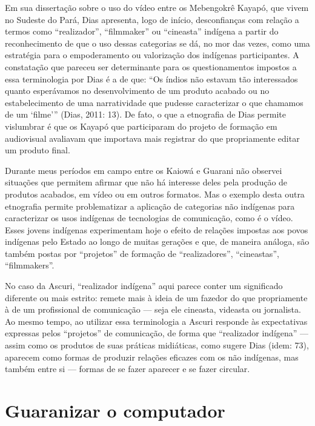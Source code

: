 Em sua dissertação sobre o uso do vídeo entre os Mebengokrê Kayapó, que
vivem no Sudeste do Pará, Dias apresenta, logo de início, desconfianças
com relação a termos como ``realizador'', ``filmmaker'' ou ``cineasta''
indígena a partir do reconhecimento de que o uso dessas categorias se
dá, no mor das vezes, como uma estratégia para o empoderamento ou
valorização dos indígenas participantes. A constatação que pareceu ser
determinante para os questionamentos impostos a essa terminologia por
Dias é a de que: ``Os índios não estavam tão interessados quanto
esperávamos no desenvolvimento de um produto acabado ou no
estabelecimento de uma narratividade que pudesse caracterizar o que
chamamos de um ‘filme’'' (Dias, 2011: 13). De fato, o que a etnografia
de Dias permite vislumbrar é que os Kayapó que participaram do projeto
de formação em audiovisual avaliavam que importava mais registrar do
que propriamente editar um produto final.

Durante meus períodos em campo entre os Kaiowá e Guarani não observei
situações que permitem afirmar que não há interesse deles pela produção
de produtos acabados, em vídeo ou em outros formatos. Mas o exemplo
desta outra etnografia permite problematizar a aplicação de categorias
não indígenas para caracterizar os usos indígenas de tecnologias de
comunicação, como é o vídeo. Esses jovens indígenas experimentam hoje o
efeito de relações impostas aos povos indígenas pelo Estado ao longo de
muitas gerações e que, de maneira análoga, são também postas por
``projetos'' de formação de ``realizadores'', ``cineastas'', ``filmmakers''.

No caso da Ascuri, ``realizador indígena'' aqui parece conter um
significado diferente ou mais estrito: remete mais à ideia de um
fazedor do que propriamente à de um profissional de comunicação --- seja
ele cineasta, videasta ou jornalista. Ao mesmo tempo, ao utilizar essa
terminologia a Ascuri responde às expectativas expressas pelos
``projetos'' de comunicação, de forma que ``realizador indígena'' --- assim
como os produtos de suas práticas midiáticas, como sugere Dias (idem:
73), aparecem como formas de produzir relações eficazes com os não
indígenas, mas também entre si --- formas de se fazer aparecer e se fazer
circular.


\section{Guaranizar o computador}

